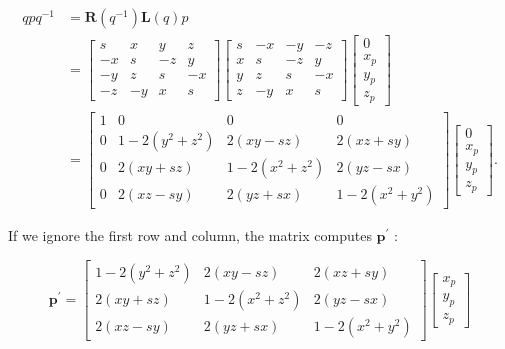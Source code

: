 $$
\begin{aligned}
q p q^{-1} & =\mathbf{R}\left(q^{-1}\right) \mathbf{L}(q) p \\
& =\left[\begin{array}{cccc}
s & x & y & z \\
-x & s & -z & y \\
-y & z & s & -x \\
-z & -y & x & s
\end{array}\right]\left[\begin{array}{cccc}
s & -x & -y & -z \\
x & s & -z & y \\
y & z & s & -x \\
z & -y & x & s
\end{array}\right]\left[\begin{array}{c}
0 \\
x_{p} \\
y_{p} \\
z_{p}
\end{array}\right] \\
& =\left[\begin{array}{cccc}
1 & 0 & 0 & 0 \\
0 & 1-2\left(y^{2}+z^{2}\right) & 2(x y-s z) & 2(x z+s y) \\
0 & 2(x y+s z) & 1-2\left(x^{2}+z^{2}\right) & 2(y z-s x) \\
0 & 2(x z-s y) & 2(y z+s x) & 1-2\left(x^{2}+y^{2}\right)
\end{array}\right]\left[\begin{array}{c}
0 \\
x_{p} \\
y_{p} \\
z_{p}
\end{array}\right] .
\end{aligned}
$$

If we ignore the first row and column, the matrix computes $\mathbf{p}^{\prime}$ :

$$
\mathbf{p}^{\prime}=\left[\begin{array}{ccc}
1-2\left(y^{2}+z^{2}\right) & 2(x y-s z) & 2(x z+s y) \\
2(x y+s z) & 1-2\left(x^{2}+z^{2}\right) & 2(y z-s x) \\
2(x z-s y) & 2(y z+s x) & 1-2\left(x^{2}+y^{2}\right)
\end{array}\right]\left[\begin{array}{l}
x_{p} \\
y_{p} \\
z_{p}
\end{array}\right]
$$

